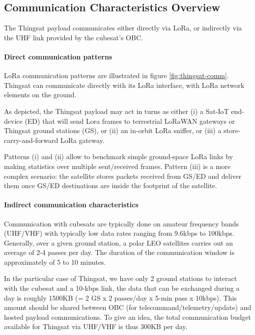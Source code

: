 \subsection{Communication Characteristics Overview}
\label{sec:thingsat-comm-characteristics}

The Thingsat payload communicates either directly via LoRa, or indirectly via the UHF link provided by the cubesat's OBC.

\paragraph*{Direct communication patterns}
LoRa communication patterns are illustrated in figure \ref{fig:thingsat-comm}.
Thingsat can communicate directly with its LoRa interface, with LoRa network elements on the ground.

As depicted, the Thingsat payload may act in turns as either 
(i) a Sat-IoT end-device (ED) that will send Lora frames to terrestrial LoRaWAN gateways or Thingsat ground stations (GS), or 
(ii) an in-orbit LoRa sniffer, or 
(iii) a store-carry-and-forward LoRa gateway.

Patterns (i) and (ii) allow to benchmark simple ground-space LoRa links by
making statistics over multiple sent/received frames. Pattern (iii) is a more
complex scenario: the satellite stores packets received from GS/ED and deliver
them once GS/ED destinations are inside the footprint of the satellite.

\paragraph*{Indirect communication characteristics}
Communication with cubesats are typically done on amateur frequency
bands (UHF/VHF) with typically low data rates ranging from 9.6kbps to
100kbps. 
Generally, over a given ground station, a polar LEO satellites carries out an average of 2-4 passes per day. The duration of the communication window is approximately of 5 to 10
minutes. 

In the particular case of Thingsat, we have only 2 ground stations to interact with the cubesat and a 10-kbps
link, the data that can be exchanged during a day is roughly 1500KB (= 2 GS x 2
passes/day x 5-min pass x 10kbps). This amount should be shared between OBC
(for telecommand/telemetry/update) and hosted payload communications. To give an
idea, the total communication budget available for Thingsat via UHF/VHF is thus 300KB per day. 


